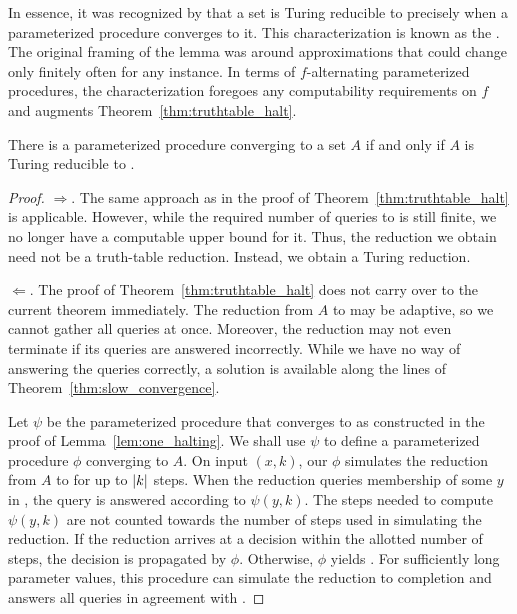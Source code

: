 In essence, it was recognized by \textcite{shoenfield1959degrees} that a set is Turing reducible to  precisely when a parameterized procedure converges to it.
This characterization is known as the  \parencite{odifreddi1992classical,downey2010algorithmic}.
The original framing of the lemma was around approximations that could change only finitely often for any instance.
In terms of $f$-alternating parameterized procedures, the characterization foregoes any computability requirements on $f$ and augments Theorem~\ref{thm:truthtable_halt}.
\begin{theorem}
\label{thm:turing_halt}
  There is a parameterized procedure converging to a set $A$ if and only if $A$ is Turing reducible to .
\end{theorem}
\begin{proof}
  $\Longrightarrow$.
  The same approach as in the proof of Theorem~\ref{thm:truthtable_halt} is applicable.
  However, while the required number of queries to  is still finite, we no longer have a computable upper bound for it.
  Thus, the reduction we obtain need not be a truth-table reduction.
  Instead, we obtain a Turing reduction.

  $\Longleftarrow$.
  The proof of Theorem~\ref{thm:truthtable_halt} does not carry over to the current theorem immediately.
  The reduction from $A$ to  may be adaptive, so we cannot gather all queries at once.
  Moreover, the reduction may not even terminate if its queries are answered incorrectly.
  While we have no way of answering the queries correctly, a solution is available along the lines of Theorem~\ref{thm:slow_convergence}.

  Let $\psi$ be the parameterized procedure that converges to  as constructed in the proof of Lemma~\ref{lem:one_halting}.
  We shall use $\psi$ to define a parameterized procedure $\phi$ converging to $A$.
  On input $(x, k)$, our $\phi$ simulates the reduction from $A$ to  for up to ${\lvert k\rvert}$ steps.
  When the reduction queries membership of some $y$ in , the query is answered according to $\psi(y, k)$.
  The steps needed to compute $\psi(y, k)$ are not counted towards the number of steps used in simulating the reduction.
  If the reduction arrives at a decision within the allotted number of steps, the decision is propagated by $\phi$.
  Otherwise, $\phi$ yields .
  For sufficiently long parameter values, this procedure can simulate the reduction to completion and answers all queries in agreement with .
\end{proof}

